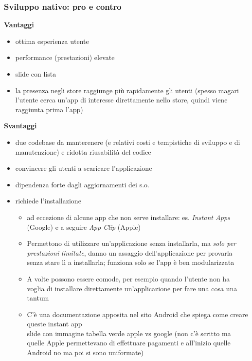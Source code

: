 \subsubsection{Sviluppo nativo: pro e contro}
\par \textbf{Vantaggi}
\begin{itemize}
    \item ottima esperienza utente
    \item performance (prestazioni) elevate
    \item slide con lista
    \item la presenza negli store raggiunge più rapidamente gli utenti (spesso magari l'utente cerca un'app di interesse direttamente nello store, quindi viene raggiunta prima l'app)
\end{itemize}

\par \textbf{Svantaggi}
\begin{itemize}
    \item due codebase da manterenere (e relativi costi e tempistiche di sviluppo e di manutenzione) e ridotta riusabilità del codice
    \item convincere gli utenti a scaricare l'applicazione
    \item dipendenza forte dagli aggiornamenti dei s.o.
    \item richiede l'installazione
    \begin{itemize}
        \item ad eccezione di alcune app che non serve installare: es. \textit{Instant Apps} (Google) e a seguire \textit{App Clip} (Apple)
        \item Permettono di utilizzare un'applicazione senza installarla, ma \textit{solo per prestazioni limitate}, danno un assaggio dell'applicazione per provarla senza stare lì a installarla; funziona solo se l'app è ben modularizzata
        \item A volte possono essere comode, per esempio quando l'utente non ha voglia di installare direttamente un'applicazione per fare una cosa una tantum
        \item C'è una documentazione apposita nel sito Android che spiega come creare queste instant app \\
        slide con immagine tabella verde apple vs google (non c'è scritto ma quelle Apple permettevano di effettuare pagamenti e all'inizio quelle Android no ma poi si sono uniformate)
    \end{itemize}
\end{itemize}

